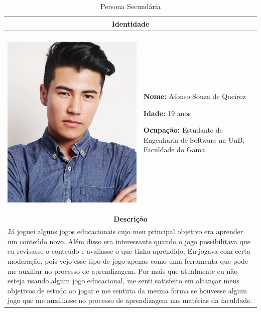 \begin{table}[htbp]
\centering
\caption{Persona Secundária}
\label{tab:Table_persona2}
\small
\begin{tabular}{| m{} m{}|}
\hline \multicolumn{2}{|c|}{\textbf{Identidade}} \\ \hline
& \\

\begin{center} \includegraphics[scale=0.06]{figuras/personas/model-2911332_1920.jpg} \end{center} 

&

\textbf{Nome: } Afonso Souza de Queiroz

\textbf{Idade:} 19 anos

\textbf{Ocupação:} Estudante de Engenharia de Software na UnB, Faculdade do Gama

\\ \hline


\multicolumn{2}{|c|}{\textbf{Descrição}} \\ \hline
\multicolumn{2}{|p{15cm}|}{
        Já joguei alguns jogos educacionais cujo meu principal objetivo era aprender um conteúdo novo. Além disso era interessante quando o jogo possibilitava que eu revisasse o conteúdo e avaliasse o que tinha aprendido. Eu jogava com certa moderação, pois vejo esse tipo de jogo apenas como uma ferramenta que pode me auxiliar no processo de aprendizagem. Por mais que atualmente eu não esteja usando algum jogo educacional, me senti satisfeito em alcançar meus objetivos de estudo ao jogar e me sentiria da mesma forma se houvesse algum jogo que me auxiliasse no processo de aprendizagem nas matérias da faculdade. 
        
}
\end{tabular}
\end{table}
